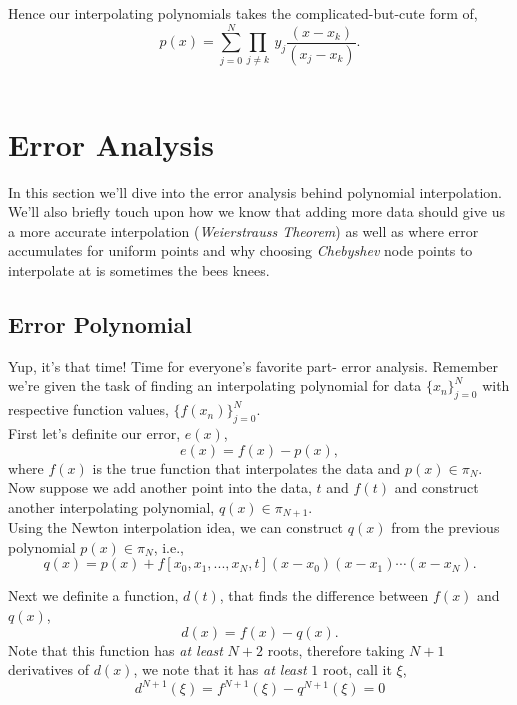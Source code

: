 \documentclass[paper=a4, fontsize=11pt]{scrartcl} %
\numberwithin{equation}{section} %
\numberwithin{figure}{section} %
\numberwithin{table}{section} %
\begin{document}
Hence our interpolating polynomials takes the complicated-but-cute form of, $$p(x) = \sum_{j=0}^{N} \prod_{j\neq k} \ y_j \frac{ (x-x_k) }{(x_j-x_k)}.$$ \\



%
%
%
%
%
%
\section{Error Analysis}

$ $\\

In this section we'll dive into the error analysis behind polynomial interpolation. We'll also briefly touch upon how we know that adding more data should give us a more accurate interpolation (\emph{Weierstrauss Theorem}) as well as where error accumulates for uniform points and why choosing \emph{Chebyshev} node points to interpolate at is sometimes the bees knees.  

\subsection{Error Polynomial}

$ $\\

Yup, it's that time! Time for everyone's favorite part- error analysis. Remember we're given the task of finding an interpolating polynomial for data $\{x_n\}_{j=0}^{N}$ with respective function values, $\{ f(x_n)\}_{j=0}^{N}.$ \\

First let's definite our error, $e(x)$, $$e(x) = f(x) - p(x),$$ where $f(x)$ is the true function that interpolates the data and $p(x)\in\pi_{N}.$ Now suppose we add another point into the data, $t$ and $f(t)$ and construct another interpolating polynomial, $q(x)\in\pi_{N+1}.$\\

Using the Newton interpolation idea, we can construct $q(x)$ from the previous polynomial $p(x)\in\pi_{N}$, i.e., $$q(x) = p(x) + f[x_0,x_1,...,x_N,t](x-x_0)(x-x_1)\cdots(x-x_N).$$
  
Next we definite a function, $d(t)$, that finds the difference between $f(x)$ and $q(x)$, $$d(x) = f(x) - q(x).$$ Note that this function has \emph{at least} $N+2$ roots, therefore taking $N+1$ derivatives of $d(x)$, we note that it has \emph{at least} $1$ root, call it $\xi$, $$d^{N+1}(\xi) = f^{N+1}(\xi) - q^{N+1}(\xi) = 0$$
\end{document}
